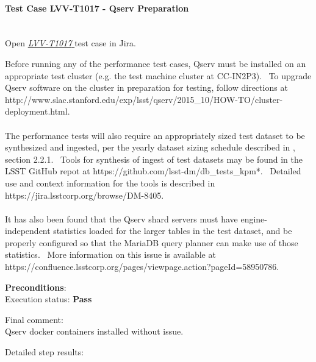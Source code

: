 \documentclass[DM,lsstdraft,STR,toc]{lsstdoc}
\begin{document}
    \paragraph{Test Case LVV-T1017 - Qserv Preparation
 }\mbox{}\\

Open  \href{https://jira.lsstcorp.org/secure/Tests.jspa#/testCase/LVV-T1017}{\textit{ LVV-T1017 } }
test case in Jira.

    Before running any of the performance test cases, Qserv must be
installed on an appropriate test cluster (e.g. the test machine cluster
at CC-IN2P3). ~To upgrade Qserv software on the cluster in preparation
for testing, follow directions at
http://www.slac.stanford.edu/exp/lsst/qserv/2015\_10/HOW-TO/cluster-deployment.html.\\
~\\
The performance tests will also require an appropriately sized test
dataset to be synthesized and ingested, per the yearly dataset sizing
schedule described in , section 2.2.1. ~Tools for synthesis of
ingest of test datasets may be found in the LSST GitHub repot at
https://github.com/lsst-dm/db\_tests\_kpm*. ~Detailed use and context
information for the tools is described in
https://jira.lsstcorp.org/browse/DM-8405.\\
~\\
It has also been found that the Qserv shard servers must have
engine-independent statistics loaded for the larger tables in the test
dataset, and be properly configured so that the MariaDB query planner
can make use of those statistics. ~More information on this issue is
available at
https://confluence.lsstcorp.org/pages/viewpage.action?pageId=58950786.


    \textbf{ Preconditions}:\\
    

    Execution status: {\bf Pass }

    Final comment:\\Qserv docker containers installed without issue.



    Detailed step results:
\end{document}
